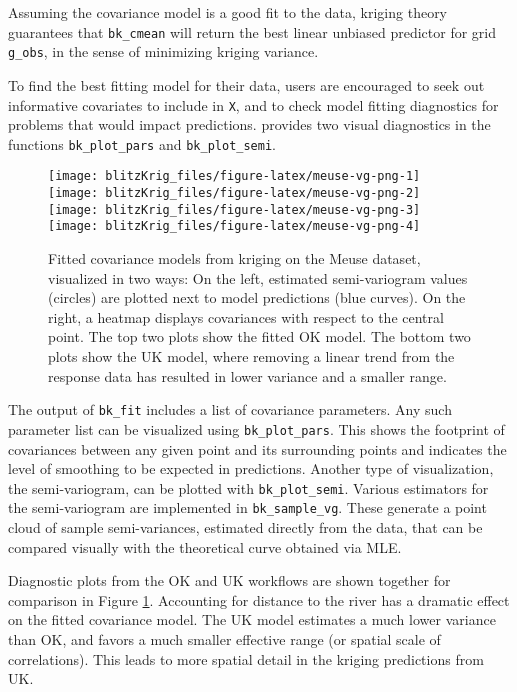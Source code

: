 Assuming the covariance model is a good fit to the data, kriging theory guarantees that \texttt{bk\_cmean} will return the best linear unbiased predictor for grid \texttt{g\_obs}, in the sense of minimizing kriging variance.

To find the best fitting model for their data, users are encouraged to seek out informative covariates to include in \texttt{X}, and to check model fitting diagnostics for problems that would impact predictions.  provides two visual diagnostics in the functions \texttt{bk\_plot\_pars} and \texttt{bk\_plot\_semi}.

\begin{figure}[!htb]
\texttt{[image: blitzKrig\_files/figure-latex/meuse-vg-png-1]} \texttt{[image: blitzKrig\_files/figure-latex/meuse-vg-png-2]} \texttt{[image: blitzKrig\_files/figure-latex/meuse-vg-png-3]} \texttt{[image: blitzKrig\_files/figure-latex/meuse-vg-png-4]} \caption{Fitted covariance models from kriging on the Meuse dataset, visualized in two ways: On the left, estimated semi-variogram values (circles) are plotted next to model predictions (blue curves). On the right, a heatmap displays covariances with respect to the central point. The top two plots show the fitted OK model. The bottom two plots show the UK model, where removing a linear trend from the response data has resulted in lower variance and a smaller range.}\label{fig:meuse-vg-png}
\end{figure}

The output of \texttt{bk\_fit} includes a list of covariance parameters. Any such parameter list can be visualized using \texttt{bk\_plot\_pars}. This shows the footprint of covariances between any given point and its surrounding points and indicates the level of smoothing to be expected in predictions. Another type of visualization, the semi-variogram, can be plotted with \texttt{bk\_plot\_semi}. Various estimators for the semi-variogram are implemented in \texttt{bk\_sample\_vg}. These generate a point cloud of sample semi-variances, estimated directly from the data, that can be compared visually with the theoretical curve obtained via MLE.

Diagnostic plots from the OK and UK workflows are shown together for comparison in Figure \ref{fig:meuse-vg-png}. Accounting for distance to the river has a dramatic effect on the fitted covariance model. The UK model estimates a much lower variance than OK, and favors a much smaller effective range (or spatial scale of correlations). This leads to more spatial detail in the kriging predictions from UK.

